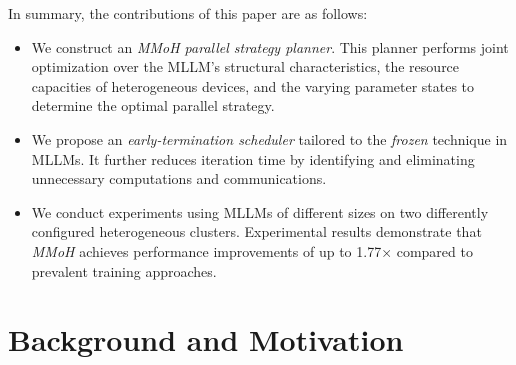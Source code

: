 \documentclass[conference]{IEEEtran}
\begin{document}
In summary, the contributions of this paper are as follows: 
\begin{itemize}
\item We construct an \textit{MMoH parallel strategy planner}.
This planner performs joint optimization over the MLLM's structural characteristics, the resource capacities of heterogeneous devices, and the varying parameter states to determine the optimal parallel strategy.
\item We propose an \textit{early-termination scheduler} tailored to the \textit{frozen} technique in MLLMs.
It further reduces iteration time by identifying and eliminating unnecessary computations and communications.
\item We conduct experiments using MLLMs of different sizes on two differently configured heterogeneous clusters. Experimental results demonstrate that \textit{MMoH} achieves performance improvements of up to 1.77× compared to prevalent training approaches.
\end{itemize}

\section{Background and Motivation}
\end{document}
